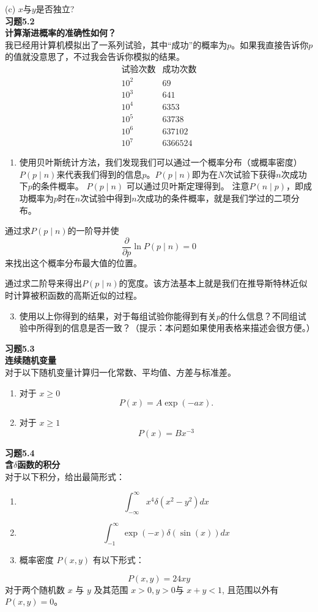 \documentclass[UTF8]{ctexart}
\numberwithin{equation}{section}%
\numberwithin{figure}{section}%
\begin{document}
    (c) $x$与$y$是否独立?\\
    \textbf{习题5.2}\label{prob5.2}\\
    \textbf{计算渐进概率的准确性如何？}\\
    我已经用计算机模拟出了一系列试验，其中“成功”的概率为$p$。如果我直接告诉你$p$的值就没意思了，不过我会告诉你模拟的结果。
    $$
    \begin{array}{cl}
    \text {试验次数} & \text {成功次数} \\
    10^{2} & 69 \\
    10^{3} & 641 \\
    10^{4} & 6353 \\
    10^{5} & 63738 \\
    10^{6} & 637102 \\
    10^{7} & 6366524
    \end{array}
    $$
    \begin{enumerate}
      \item 使用贝叶斯统计方法，我们发现我们可以通过一个概率分布（或概率密度）$P(p \mid n)$来代表我们得到的信息$p$。$P(p \mid n)$即为在$N$次试验下获得$n$次成功下$p$的条件概率。 $P(p \mid n)$ 可以通过贝叶斯定理得到。 注意$P(n \mid p)$，即成功概率为$p$时在$n$次试验中得到$n$次成功的条件概率，就是我们学过的二项分布。
    \end{enumerate}
    通过求$P(p \mid n)$的一阶导并使
    $$
    \frac{\partial}{\partial p} \ln P(p \mid n)=0
    $$
    来找出这个概率分布最大值的位置。
    
    通过求二阶导来得出$P(p \mid n)$的宽度。该方法基本上就是我们在推导斯特林近似时计算被积函数的高斯近似的过程。
    
    \begin{enumerate}
      \setcounter{enumi}{2}
      \item 使用以上你得到的结果，对于每组试验你能得到有关$p$的什么信息？不同组试验中所得到的信息是否一致？（提示：本问题如果使用表格来描述会很方便。）
    \end{enumerate}
    \textbf{习题5.3}\label{prob5.3}\\
    \textbf{连续随机变量}\\
    对于以下随机变量计算归一化常数、平均值、方差与标准差。    
    \begin{enumerate}
      \item 对于 $x \geq 0$
    $$
    P(x)=A \exp (-a x) .
    $$
      \item 对于 $x \geq 1$
    $$
    P(x)=B x^{-3}
    $$
    \end{enumerate}
    \textbf{习题5.4}\label{prob5.4}\\
    \textbf{含$\delta$函数的积分}\\
    对于以下积分，给出最简形式：    
    \begin{enumerate}
    \item
    $$
    \int_{-\infty}^{\infty} x^{4} \delta\left(x^{2}-y^{2}\right) d x
    $$
    \item
    $$
    \int_{-1}^{\infty} \exp (-x) \delta(\sin (x)) d x
    $$
    \item 概率密度 $P(x, y)$ 有以下形式：
    \end{enumerate}
    $$
    P(x, y)=24 x y
    $$
    对于两个随机数 $x$ 与 $y$ 及其范围 $x>0, y>0$与 $x+y<1$, 且范围以外有$P(x, y)=0$。
    
\end{document}
